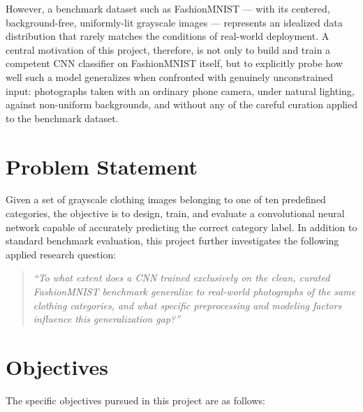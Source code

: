 \documentclass[12pt,a4paper]{report}
\begin{document}
However, a benchmark dataset such as FashionMNIST — with its centered, background-free, uniformly-lit grayscale images — represents an idealized data distribution that rarely matches the conditions of real-world deployment. A central motivation of this project, therefore, is not only to build and train a competent CNN classifier on FashionMNIST itself, but to explicitly probe how well such a model generalizes when confronted with genuinely unconstrained input: photographs taken with an ordinary phone camera, under natural lighting, against non-uniform backgrounds, and without any of the careful curation applied to the benchmark dataset.

\section{Problem Statement}
Given a set of grayscale clothing images belonging to one of ten predefined categories, the objective is to design, train, and evaluate a convolutional neural network capable of accurately predicting the correct category label. In addition to standard benchmark evaluation, this project further investigates the following applied research question:

\begin{quote}
\itshape
``To what extent does a CNN trained exclusively on the clean, curated FashionMNIST benchmark generalize to real-world photographs of the same clothing categories, and what specific preprocessing and modeling factors influence this generalization gap?''
\end{quote}

\section{Objectives}
The specific objectives pursued in this project are as follows:
\end{document}
